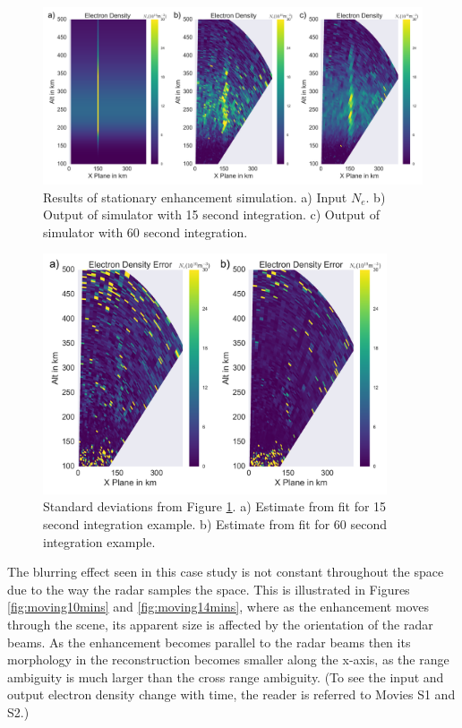 \documentclass[draft,ras]{agutex}
\begin{document}
\begin{article}
\begin{figure}[!t]
\centering
\includegraphics[width=6in]{stationary}
\caption{Results of stationary enhancement simulation. a) Input $N_e$. b) Output of simulator with 15 second integration. c) Output of simulator with 60 second integration.}
\label{fig:stationaryall}
\end{figure}

\begin{figure}[!t]
\centering
\includegraphics[width=4in]{Errorstationary}
\caption{Standard deviations from Figure \ref{fig:stationaryall}. a)  Estimate from fit for 15 second integration example. b) Estimate from fit for 60 second integration example.}
\label{fig:errorstationaryall}
\end{figure}

The blurring effect seen in this case study is not constant throughout the space due to the way the radar samples the space. This is illustrated in Figures \ref{fig:moving10mins} and \ref{fig:moving14mins}, where as the enhancement moves through the scene, its apparent size is affected by the orientation of the radar beams. As the enhancement becomes parallel to the radar beams then its morphology in the reconstruction becomes smaller along the x-axis, as the range ambiguity is much larger than the cross range ambiguity. (To see the input and output electron density change with time, the reader is referred to Movies S1 and S2.)


\end{article}
\end{document}
